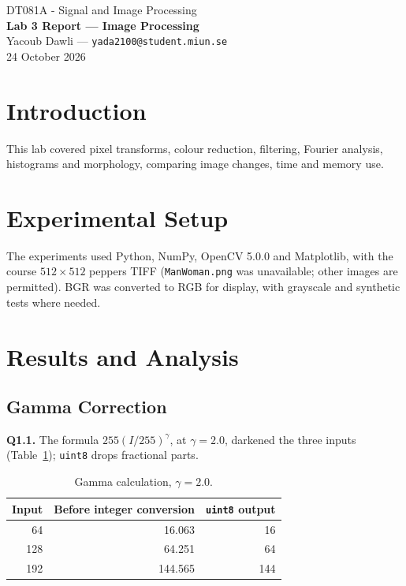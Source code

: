 \documentclass[10pt,a4paper]{article}
\begin{document}
\begin{center}
{\large DT081A - Signal and Image Processing}\\[2pt]
{\large\bfseries Lab 3 Report --- Image Processing}\\[3pt]
Yacoub Dawli --- \texttt{yada2100@student.miun.se}\\[2pt]
{\small 24 October 2026}
\end{center}
\vspace{-5pt}

\section{Introduction}
This lab covered pixel transforms, colour reduction, filtering, Fourier analysis,
histograms and morphology, comparing image changes, time and memory use.

\section{Experimental Setup}
The experiments used Python, NumPy, OpenCV 5.0.0 and Matplotlib,
with the course \(512\times512\) peppers TIFF (\texttt{ManWoman.png} was unavailable;
other images are permitted). BGR was converted to RGB for display, with grayscale
and synthetic tests where needed.

\section{Results and Analysis}
\subsection{Gamma Correction}
\textbf{Q1.1.} The formula \(255(I/255)^\gamma\), at \(\gamma=2.0\), darkened the three inputs
(Table~\ref{tab:gamma}); \texttt{uint8} drops fractional parts.

\begin{table}[H]
\centering
\caption{Gamma calculation, \(\gamma=2.0\).}\label{tab:gamma}
\begin{tabular}{rrr}\toprule
Input & Before integer conversion & \texttt{uint8} output\\\midrule
64 & 16.063 & 16\\
128 & 64.251 & 64\\
192 & 144.565 & 144\\\bottomrule
\end{tabular}
\end{table}
\end{document}
